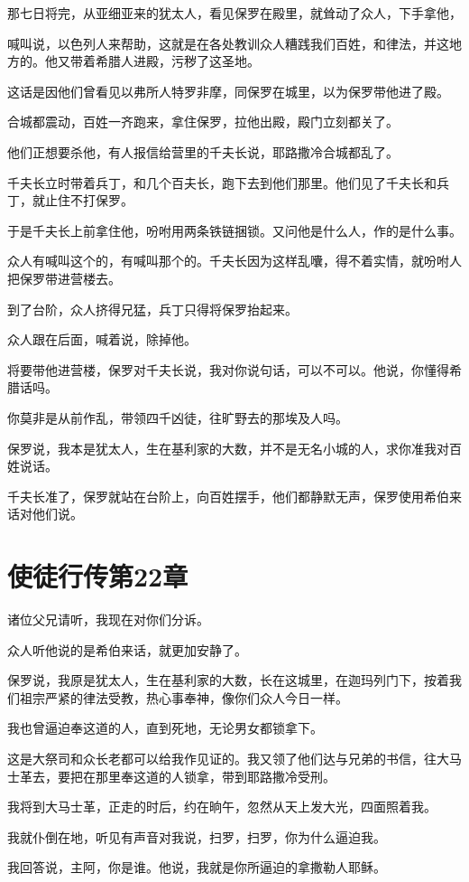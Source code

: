 \documentclass[12pt,oneside]{book}
\begin{document}
那七日将完，从亚细亚来的犹太人，看见保罗在殿里，就耸动了众人，下手拿他，

喊叫说，以色列人来帮助，这就是在各处教训众人糟践我们百姓，和律法，并这地方的。他又带着希腊人进殿，污秽了这圣地。

这话是因他们曾看见以弗所人特罗非摩，同保罗在城里，以为保罗带他进了殿。

合城都震动，百姓一齐跑来，拿住保罗，拉他出殿，殿门立刻都关了。

他们正想要杀他，有人报信给营里的千夫长说，耶路撒冷合城都乱了。

千夫长立时带着兵丁，和几个百夫长，跑下去到他们那里。他们见了千夫长和兵丁，就止住不打保罗。

于是千夫长上前拿住他，吩咐用两条铁链捆锁。又问他是什么人，作的是什么事。

众人有喊叫这个的，有喊叫那个的。千夫长因为这样乱囔，得不着实情，就吩咐人把保罗带进营楼去。

到了台阶，众人挤得兄猛，兵丁只得将保罗抬起来。

众人跟在后面，喊着说，除掉他。

将要带他进营楼，保罗对千夫长说，我对你说句话，可以不可以。他说，你懂得希腊话吗。

你莫非是从前作乱，带领四千凶徒，往旷野去的那埃及人吗。

保罗说，我本是犹太人，生在基利家的大数，并不是无名小城的人，求你准我对百姓说话。

千夫长准了，保罗就站在台阶上，向百姓摆手，他们都静默无声，保罗使用希伯来话对他们说。

\chapter{使徒行传第22章}
诸位父兄请听，我现在对你们分诉。

众人听他说的是希伯来话，就更加安静了。

保罗说，我原是犹太人，生在基利家的大数，长在这城里，在迦玛列门下，按着我们祖宗严紧的律法受教，热心事奉神，像你们众人今日一样。

我也曾逼迫奉这道的人，直到死地，无论男女都锁拿下。

这是大祭司和众长老都可以给我作见证的。我又领了他们达与兄弟的书信，往大马士革去，要把在那里奉这道的人锁拿，带到耶路撒冷受刑。

我将到大马士革，正走的时后，约在晌午，忽然从天上发大光，四面照着我。

我就仆倒在地，听见有声音对我说，扫罗，扫罗，你为什么逼迫我。

我回答说，主阿，你是谁。他说，我就是你所逼迫的拿撒勒人耶稣。
\end{document}
